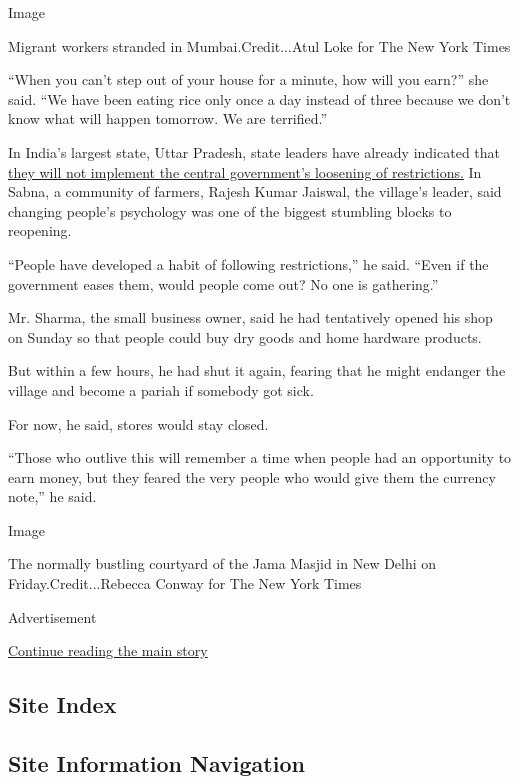 Image

Migrant workers stranded in Mumbai.Credit...Atul Loke for The New York
Times

``When you can't step out of your house for a minute, how will you
earn?'' she said. ``We have been eating rice only once a day instead of
three because we don't know what will happen tomorrow. We are
terrified.''

In India's largest state, Uttar Pradesh, state leaders have already
indicated that
\href{https://timesofindia.indiatimes.com/india/after-delhi-5-more-states-want-lockdown-extended-beyond-may-3/articleshow/75384555.cms}{they
will not implement the central government's loosening of restrictions.}
In Sabna, a community of farmers, Rajesh Kumar Jaiswal, the village's
leader, said changing people's psychology was one of the biggest
stumbling blocks to reopening.

``People have developed a habit of following restrictions,'' he said.
``Even if the government eases them, would people come out? No one is
gathering.''

Mr. Sharma, the small business owner, said he had tentatively opened his
shop on Sunday so that people could buy dry goods and home hardware
products.

But within a few hours, he had shut it again, fearing that he might
endanger the village and become a pariah if somebody got sick.

For now, he said, stores would stay closed.

``Those who outlive this will remember a time when people had an
opportunity to earn money, but they feared the very people who would
give them the currency note,'' he said.

Image

The normally bustling courtyard of the Jama Masjid in New Delhi on
Friday.Credit...Rebecca Conway for The New York Times

Advertisement

\protect\hyperlink{after-bottom}{Continue reading the main story}

\hypertarget{site-index}{%
\subsection{Site Index}\label{site-index}}

\hypertarget{site-information-navigation}{%
\subsection{Site Information
Navigation}\label{site-information-navigation}}

